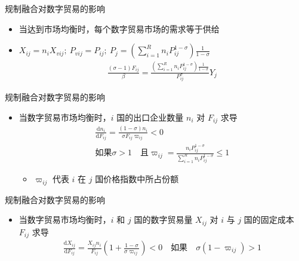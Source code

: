 \documentclass{beamer}
\begin{document}
\begin{frame}{规制融合对数字贸易的影响}
    \begin{itemize}
        \item 当达到市场均衡时，每个数字贸易市场的需求等于供给
        \item $X_{ij}=n_i X_{vij};\ P_{vij}=P_{ij};\ P_{j}=(\sum_{i=1}^R n_iP_{ij}^{1-\sigma}){\frac{1}{1-\sigma}}$
        \begin{align}
            \frac{(\sigma - 1)F_{ij}}{\beta} = \frac{(\sum_{i=1}^R n_iP_{ij}^{1-\sigma}){\frac{1}{1-\sigma}}}{P_{ij}^{\sigma}} Y_j \tag{9}
        \end{align}
    \end{itemize}
\end{frame}

\begin{frame}{规制融合对数字贸易的影响}
    \begin{itemize}
        \item 当数字贸易市场均衡时，$i$ 国的出口企业数量 $n_i$ 对 $F_{ij}$ 求导
        \begin{gather*}
            \frac{{\mathrm{d}n_i}}{{\mathrm{d}F_{ij}}} = \frac{(1-\sigma)n_i}{\sigma F_{ij}\varpi_{ij}} < 0 \tag{10} \\
            \text{如果} \sigma > 1 \quad \text{且} \varpi_{ij}=\frac{n_iP_{ij}^{1-\sigma}}{\sum_{i=1}^R n_i P_{ij}^{1-\sigma}} \leqslant 1
        \end{gather*}
        \begin{itemize}
            \item $\varpi_{ij}$ 代表 $i$ 在 $j$ 国价格指数中所占份额
        \end{itemize}
    \end{itemize}
\end{frame}

\begin{frame}{规制融合对数字贸易的影响}
    \begin{itemize}
        \item 当数字贸易市场均衡时，$i$ 和 $j$ 国的数字贸易量 $X_{ij}$ 对 $i$ 与 $j$ 国的固定成本 $F_{ij}$ 求导
        \begin{gather*}
            \frac{\mathrm{d}X_{ij}}{\mathrm{d}F_{ij}} = \frac{X_{ij}n_i}{F_{ij}}\left(1+\frac{1-\sigma}{\sigma \varpi_{ij}}\right)<0 \quad \text{如果} \quad \sigma(1-\varpi_{ij})>1 \tag{11}
        \end{gather*}
    \end{itemize}
\end{frame}
\end{document}
